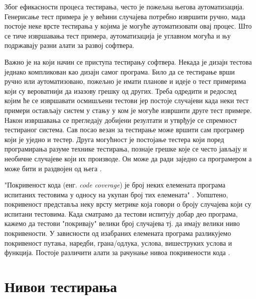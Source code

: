 \documentclass[12pt,oneside]{memoir}
\begin{document}
Због ефикасности процеса тестирања, често је пожељна његова аутоматизација. Генерисање тест примера је у већини случајева потребно извршити ручно, мада постоје неке врсте тестирања у којима је могуће аутоматизовати овај процес. Што се тиче извршавања тест примера, аутоматизација је углавном могућа и њу подржавају разни алати за развој софтвера.

Важно је на који начин се приступа тестирању софтвера. Некада је дизајн тестова једнако компликован као дизајн самог програма. Било да се тестирање врши ручно или аутоматизовано, пожељно је имати планове и идеје о тест примерима који су вероватнији да изазову грешку од других. Треба одредити и редослед којим ће се извршавати осмишљени тестови јер постоје случајеви када неки тест примери остављају систем у стању у ком је могуће извршити друге тест примере. Након извршавања се прегледају добијени резултати и утврђује се спремност тестираног система. Сав посао везан за тестирање може вршити сам програмер који је уједно и тестер. Друга могућност је постојање тестера који поред програмирања разуме технике тестирања, познаје грешке које се често јављају и необичне случајеве који их производе. Он може да ради заједно са програмером а може бити и раздвојен од њега \cite{guideTestDesign, testMilena}.

"Покривеност кода (енг. \textit{code coverage}) је број неких елемената програма испитаних тестовима у односу на укупан број тих елемената" \cite{testMilena}. Уопштено, покривеност представља неку врсту метрике која говори о броју случајева који су испитани тестовима. Када сматрамо да тестови испитују добар део програма, кажемо да тестови "покривају" велики број случајева тј. да имају велики ниво покривености. У зависности од изабраних елемената програма разликујемо покривеност путања, наредби, грана/одлука, услова, вишеструких услова и функција. Постоје различити алати за рачунање нивоа покривености кода \cite{testMilena}.
\section{Нивои тестирања}
\label{sec:nivoiTest}
\end{document}
